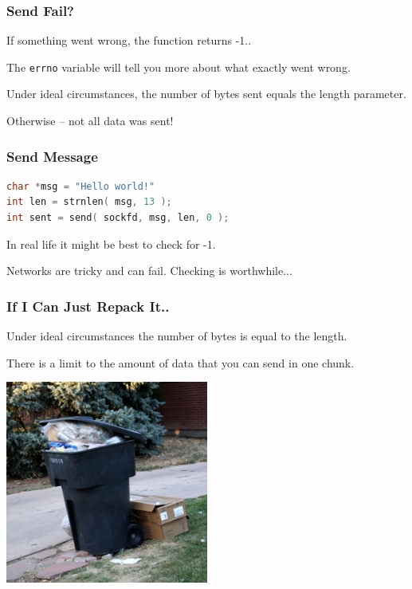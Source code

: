 \begin{frame}
	\frametitle{Send Fail?}

	If something went wrong, the function returns -1..

	The \texttt{errno} variable will tell you more about what exactly went wrong.

	Under ideal circumstances, the number of bytes sent equals the length parameter.

	Otherwise -- not all data was sent!

\end{frame}



\begin{frame}[fragile]
	\frametitle{Send Message}

	\begin{lstlisting}[language=C]
char *msg = "Hello world!"
int len = strnlen( msg, 13 );
int sent = send( sockfd, msg, len, 0 );
\end{lstlisting}

	In real life it might be best to check for -1.

	Networks are tricky and can fail. Checking is worthwhile...

\end{frame}



\begin{frame}
	\frametitle{If I Can Just Repack It..}

	Under ideal circumstances the number of bytes is equal to the length.

	There is a limit to the amount of data that you can send in one chunk.

	\begin{center}
		\includegraphics[width=0.5\textwidth]{images/overflowing-garbage.jpg}
	\end{center}

\end{frame}



